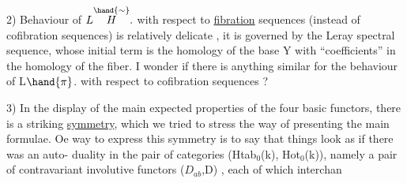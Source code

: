 2) Behaviour of $L\overset{\hand{\sim}}{H}.$ with respect to \uline{fibration} sequences 
(instead of cofibration sequences)  is  relatively delicate , it is
governed by the Leray spectral sequence, whose initial term is the
homology of the base Y with ``coefficients'' in the homology of the 
 fiber. I wonder if there is anything similar for the behaviour
of L$\hand{\pi}$. with respect to cofibration sequences ?

3) In the display of the main expected properties of the four
basic functors, there is a striking \uline{symmetry}, which we tried to stress
  the way of presenting the main formulae. Oe way to express
this symmetry is to say that things look  as if there was an auto-%
duality in the pair of categories (Htab$_0$(k), Hot$_0$(k)), namely a pair
of contravariant involutive functors ($D_{ab}$,D) , each of which interchan


